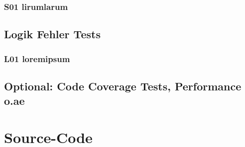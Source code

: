 \documentclass[a4paper,11pt]{article}
\begin{document}
{\subsubsection{S01 lirumlarum}

\subsection{Logik Fehler Tests}

\subsubsection{L01 loremipsum}

\subsection{Optional: Code Coverage Tests, Performance o.ae}

\section{Source-Code}
\begin{center}


\end{center}}
\end{document}
